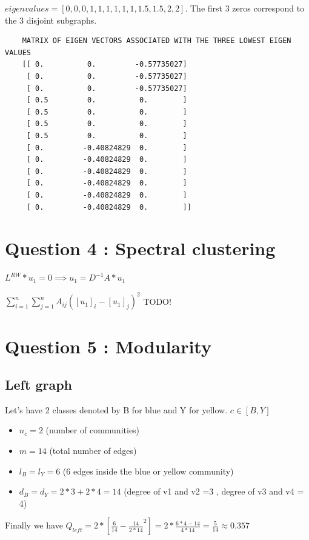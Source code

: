 \documentclass[a4paper]{article}
\begin{document}
$eigen values = [0, 0, 0, 1 , 1, 1, 1, 1, 1, 1.5, 1.5, 2, 2]$. 
The first 3 zeros correspond to the 3 disjoint subgraphs.


\begin{verbatim}
    MATRIX OF EIGEN VECTORS ASSOCIATED WITH THE THREE LOWEST EIGEN VALUES
    [[ 0.          0.         -0.57735027]
     [ 0.          0.         -0.57735027]
     [ 0.          0.         -0.57735027]
     [ 0.5         0.          0.        ]
     [ 0.5         0.          0.        ]
     [ 0.5         0.          0.        ]
     [ 0.5         0.          0.        ]
     [ 0.         -0.40824829  0.        ]
     [ 0.         -0.40824829  0.        ]
     [ 0.         -0.40824829  0.        ]
     [ 0.         -0.40824829  0.        ]
     [ 0.         -0.40824829  0.        ]
     [ 0.         -0.40824829  0.        ]]     
\end{verbatim}

\section{Question 4 : Spectral clustering}
$L^{RW}*u_1 = 0 \implies u_1 = D^{-1}A*u_1$


$\sum_{i=1}^{n}\sum_{j=1}^{n}A_{ij}([u_1]_i - [u_1]_j)^2$
TODO!

\section{Question 5 : Modularity}
\subsection*{Left graph}
Let's have 2 classes denoted by B for blue and Y for yellow. $c \in [B, Y]$
\begin{itemize}
    \item $n_c = 2$ (number of communities)
    \item $m = 14$ (total number of edges)
    \item $l_B = l_Y  = 6$ (6 edges inside the blue or yellow community)
    \item $d_B = d_Y = 2*3 + 2*4 = 14$ (degree of v1 and v2 =3 , degree of v3 and v4 = 4)
\end{itemize}
Finally we have $Q_{left} = 2*\left[ \frac{6}{14} - \frac{14}{2*14}^2 \right]=2*\frac{6*4-14}{4*14}=\frac{5}{14}\approx 0.357$
\end{document}
